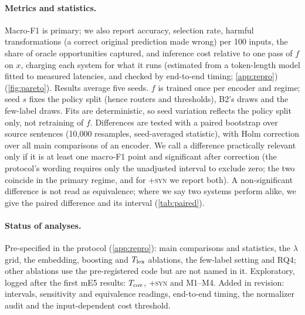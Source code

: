 \paragraph{Metrics and statistics.}
Macro-F1 is primary; we also report accuracy, selection rate, harmful transformations (a correct original prediction made wrong) per 100 inputs, the share of oracle opportunities captured, and inference cost relative to one pass of $f$ on $x$, charging each system for what it runs (estimated from a token-length model fitted to measured latencies, and checked by end-to-end timing; \cref{app:repro}) (\cref{fig:pareto}). Results average five seeds. $f$ is trained once per encoder and regime; seed $s$ fixes the policy split (hence routers and thresholds), B2's draws and the few-label draws. Fits are deterministic, so seed variation reflects the policy split only, not retraining of $f$. Differences are tested with a paired bootstrap over source sentences \citep{koehn2004bootstrap,dror2018hitchhiker} (10{,}000 resamples, seed-averaged statistic), with Holm correction over all main comparisons of an encoder. We call a difference practically relevant only if it is at least one macro-F1 point and significant after correction (the protocol's wording requires only the unadjusted interval to exclude zero; the two coincide in the primary regime, and for \textsc{+syn} we report both). A non-significant difference is not read as equivalence; where we say two systems perform alike, we give the paired difference and its interval (\cref{tab:paired}).

\paragraph{Status of analyses.} Pre-specified in the protocol (\cref{app:repro}): main comparisons and statistics, the $\lambda$ grid, the embedding, boosting and $T_{\rm lex}$ ablations, the few-label setting and RQ4; other ablations use the pre-registered code but are not named in it. Exploratory, logged after the first mE5 results: $T_{\rm cov}$, \textsc{+syn} and M1--M4. Added in revision: intervals, sensitivity and equivalence readings, end-to-end timing, the normalizer audit and the input-dependent cost threshold.

